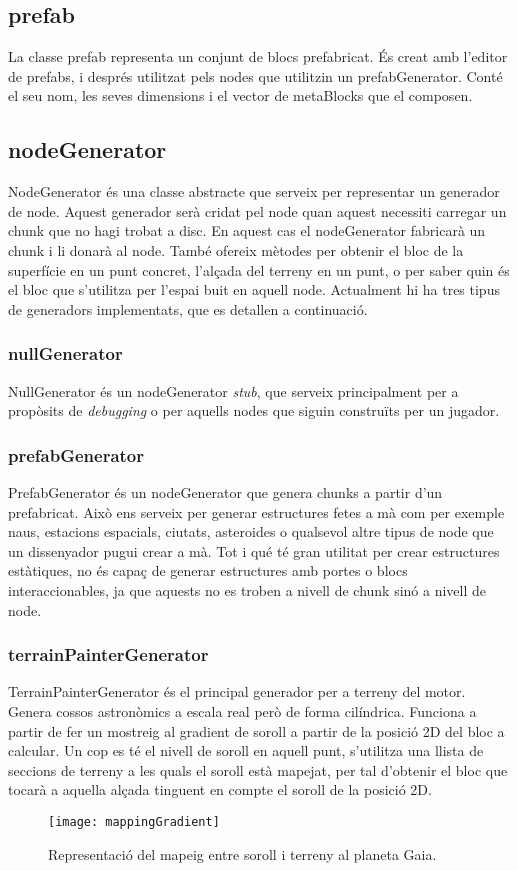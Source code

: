 \subsection{prefab}
La classe prefab representa un conjunt de blocs prefabricat. És creat amb l'editor de prefabs, i després utilitzat pels nodes que utilitzin un prefabGenerator. Conté el seu nom, les seves dimensions i el vector de metaBlocks que el composen.
\subsection{nodeGenerator}
NodeGenerator és una classe abstracte que serveix per representar un generador de node. Aquest generador serà cridat pel node quan aquest necessiti carregar un chunk que no hagi trobat a disc. En aquest cas el nodeGenerator fabricarà un chunk i li donarà al node. També ofereix mètodes per obtenir el bloc de la superfície en un punt concret, l'alçada del terreny en un punt, o per saber quin és el bloc que s'utilitza per l'espai buit en aquell node.
Actualment hi ha tres tipus de generadors implementats, que es detallen a continuació.
\subsubsection{nullGenerator}
NullGenerator és un nodeGenerator \textit{stub}, que serveix principalment per a propòsits de \textit{debugging} o per aquells nodes que siguin construïts per un jugador.
\subsubsection{prefabGenerator}
PrefabGenerator és un nodeGenerator que genera chunks a partir d'un prefabricat. Això ens serveix per generar estructures fetes a mà com per exemple naus, estacions espacials, ciutats, asteroides o qualsevol altre tipus de node que un dissenyador pugui crear a mà.
Tot i qué té gran utilitat per crear estructures estàtiques, no és capaç de generar estructures amb portes o blocs interaccionables, ja que aquests no es troben a nivell de chunk sinó a nivell de node.
\subsubsection{terrainPainterGenerator}
TerrainPainterGenerator és el principal generador per a terreny del motor. Genera cossos astronòmics a escala real però de forma cilíndrica.
Funciona a partir de fer un mostreig al gradient de soroll a partir de la posició 2D del bloc a calcular. Un cop es té el nivell de soroll en aquell punt, s'utilitza una llista de seccions de terreny a les quals el soroll està mapejat, per tal d'obtenir el bloc que tocarà a aquella alçada tinguent en compte el soroll de la posició 2D.
\begin{figure}[H]
  \centering
  \texttt{[image: mappingGradient]}
  \caption{Representació del mapeig entre soroll i terreny al planeta Gaia.}
\end{figure}


